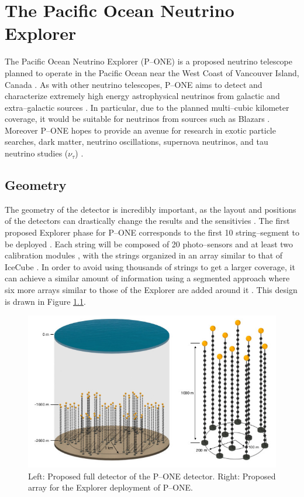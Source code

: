 \chapter{The Pacific Ocean Neutrino Explorer}

The  Pacific Ocean Neutrino Explorer (P--ONE) is a proposed neutrino telescope planned to operate in the Pacific Ocean near the West Coast of Vancouver Island, Canada \cite{pone}. As with other neutrino telescopes, P--ONE aims to detect and characterize extremely high energy astrophysical neutrinos from galactic and extra--galactic sources \cite{pone}. In particular, due to the planned multi--cubic kilometer coverage, it would be suitable for neutrinos from sources such as Blazars \cite{icecube_nat}. Moreover P--ONE hopes to provide an avenue for research in exotic particle searches, dark matter, neutrino oscillations, supernova neutrinos, and tau neutrino studies ($\nu_{\tau}$) \cite{pone}. 

\section{Geometry}

The geometry of the detector is incredibly important, as the layout and positions of the detectors can drastically change the results and the sensitivies \cite{icecube}. The first proposed Explorer phase for P--ONE corresponds to the first 10 string--segment to be deployed \cite{pone}. Each string will be composed of 20 photo--sensors and at least two calibration modules \cite{pone}, with the strings organized in an array similar to that of IceCube \cite{pone,icecube}. In order to avoid using thousands of strings to get a larger coverage, it can achieve a similar amount of information using a segmented approach where six more arrays similar to those of the Explorer are added around it \cite{pone}. This design is drawn in Figure \ref{fig:pone_geo}. 

\begin{figure}[h]
  \centering
  \includegraphics[width=12cm]{./Figures/PONEv0_-23_design.jpg}
  \caption{Left: Proposed full detector of the P--ONE detector. Right: Proposed array for the Explorer deployment of P--ONE.}
  \label{fig:pone_geo}
\end{figure}

